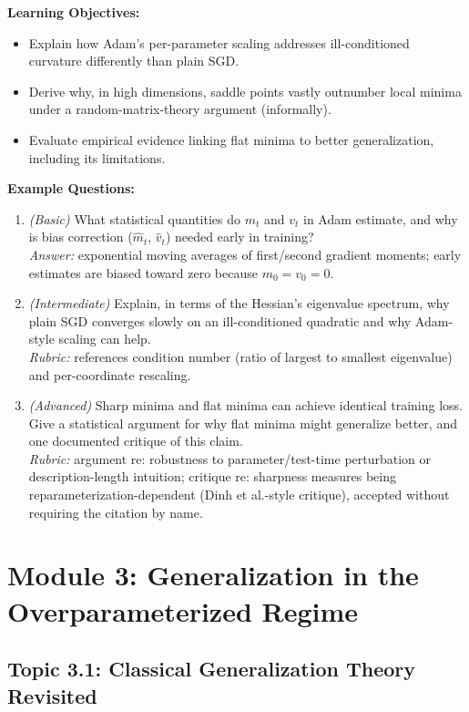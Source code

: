 \documentclass[11pt]{article}
\begin{document}
\textbf{Learning Objectives:}
\begin{itemize}
  \item Explain how Adam's per-parameter scaling addresses ill-conditioned curvature differently than plain SGD.
  \item Derive why, in high dimensions, saddle points vastly outnumber local minima under a random-matrix-theory argument (informally).
  \item Evaluate empirical evidence linking flat minima to better generalization, including its limitations.
\end{itemize}

\textbf{Example Questions:}
\begin{enumerate}
  \item \textit{(Basic)} What statistical quantities do $m_t$ and $v_t$ in Adam estimate, and why is bias correction ($\hat m_t$, $\hat v_t$) needed early in training? \\
  \textit{Answer:} exponential moving averages of first/second gradient moments; early estimates are biased toward zero because $m_0 = v_0 = 0$.
  \item \textit{(Intermediate)} Explain, in terms of the Hessian's eigenvalue spectrum, why plain SGD converges slowly on an ill-conditioned quadratic and why Adam-style scaling can help. \\
  \textit{Rubric:} references condition number (ratio of largest to smallest eigenvalue) and per-coordinate rescaling.
  \item \textit{(Advanced)} Sharp minima and flat minima can achieve identical training loss. Give a statistical argument for why flat minima might generalize better, and one documented critique of this claim. \\
  \textit{Rubric:} argument re: robustness to parameter/test-time perturbation or description-length intuition; critique re: sharpness measures being reparameterization-dependent (Dinh et al.-style critique), accepted without requiring the citation by name.
\end{enumerate}
\section{Module 3: Generalization in the Overparameterized Regime}

\subsection{Topic 3.1: Classical Generalization Theory Revisited}
\end{document}

